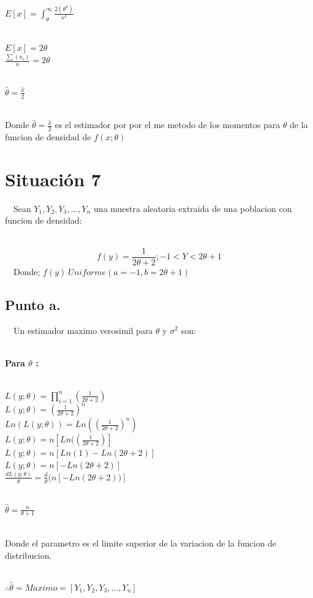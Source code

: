 \documentclass[letterpaper,12pt,onecolumn,titlepage]{article}
\begin{document}
~\\ $E[x]=\int_{\theta}^{\infty} \frac{2(\theta^2)}{x^3}$

~\\ $E[x]= 2\theta$
~\\ $\frac{\sum(x_{i})}{n} = 2\theta$

~\\ $\hat\theta = \frac{\hat{x}}{2}$

~\\ Donde $\hat\theta = \frac{\hat{x}}{2}$ es el estimador por por el me metodo de los momentos para $\theta$ de la funcion de densidad de $f({x;\theta})$


\pagebreak\section{Situaci\'{o}n 7}
~\ Sean $Y_{1}, Y_{2}, Y_{3},...,Y_{n}$ una muestra aleatoria extraida de una poblacion con funcion de densidad:

~\ $$f({y})= \frac{1}{2\theta +2}  ;  -1<Y<2\theta+1$$
~\ Donde; $f({y}) ~ Uniforme(a=-1,b=2\theta+1)$

\subsection{Punto a.}
~\ Un estimador maximo verosimil para $\theta$ y $\sigma^{2}$ son:

~\\ \textbf{Para $\theta$ :}

~\\ $L(y;\theta) = \prod_{i=1}^n{}(\frac{1}{2\theta +2})$
~\\ $L(y;\theta) = (\frac{1}{2\theta +2})^{n}$
~\\ $Ln(L(y;\theta)) = Ln((\frac{1}{2\theta +2})^{n})$
~\\ $L(y;\theta) = n[Ln((\frac{1}{2\theta +2})]$
~\\ $L(y;\theta) = n[Ln(1)-Ln({2\theta+2})]$
~\\ $L(y;\theta) = n[-Ln({2\theta+2})]$
~\\ $\frac{dL(y;\theta)}{\theta} = \frac{d}{\theta}(n[-Ln({2\theta+2}))]$

~\\ $\hat{\theta} = \frac{n}{\theta+1}$

~\\ Donde el parametro es el limite superior de la variacion de la funcion de distribucion. 

~\\ $\therefore \hat{\theta} = Maximo = [Y_{1}, Y_{2}, Y_{3},...,Y_{n}]$ 
\end{document}
